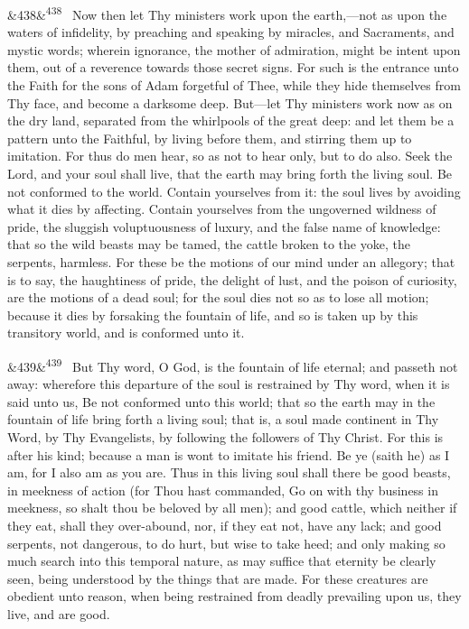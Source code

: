 \documentclass[12pt]{article}
\newcommand{\para}[1][]{\par\noindent\ifx&#1&\else\textsuperscript{\footnotesize #1}~\fi}
\begin{document}
\para[438] Now then let Thy ministers work upon the earth,---not as upon the waters of infidelity, by preaching and speaking by miracles, and Sacraments, and mystic words; wherein ignorance, the mother of admiration, might be intent upon them, out of a reverence towards those secret signs. For such is the entrance unto the Faith for the sons of Adam forgetful of Thee, while they hide themselves from Thy face, and become a darksome deep. But---let Thy ministers work now as on the dry land, separated from the whirlpools of the great deep: and let them be a pattern unto the Faithful, by living before them, and stirring them up to imitation. For thus do men hear, so as not to hear only, but to do also. Seek the Lord, and your soul shall live, that the earth may bring forth the living soul. Be not conformed to the world. Contain yourselves from it: the soul lives by avoiding what it dies by affecting. Contain yourselves from the ungoverned wildness of pride, the sluggish voluptuousness of luxury, and the false name of knowledge: that so the wild beasts may be tamed, the cattle broken to the yoke, the serpents, harmless. For these be the motions of our mind under an allegory; that is to say, the haughtiness of pride, the delight of lust, and the poison of curiosity, are the motions of a dead soul; for the soul dies not so as to lose all motion; because it dies by forsaking the fountain of life, and so is taken up by this transitory world, and is conformed unto it.

\para[439] But Thy word, O God, is the fountain of life eternal; and passeth not away: wherefore this departure of the soul is restrained by Thy word, when it is said unto us, Be not conformed unto this world; that so the earth may in the fountain of life bring forth a living soul; that is, a soul made continent in Thy Word, by Thy Evangelists, by following the followers of Thy Christ. For this is after his kind; because a man is wont to imitate his friend. Be ye (saith he) as I am, for I also am as you are. Thus in this living soul shall there be good beasts, in meekness of action (for Thou hast commanded, Go on with thy business in meekness, so shalt thou be beloved by all men); and good cattle, which neither if they eat, shall they over-abound, nor, if they eat not, have any lack; and good serpents, not dangerous, to do hurt, but wise to take heed; and only making so much search into this temporal nature, as may suffice that eternity be clearly seen, being understood by the things that are made. For these creatures are obedient unto reason, when being restrained from deadly prevailing upon us, they live, and are good.
\end{document}
